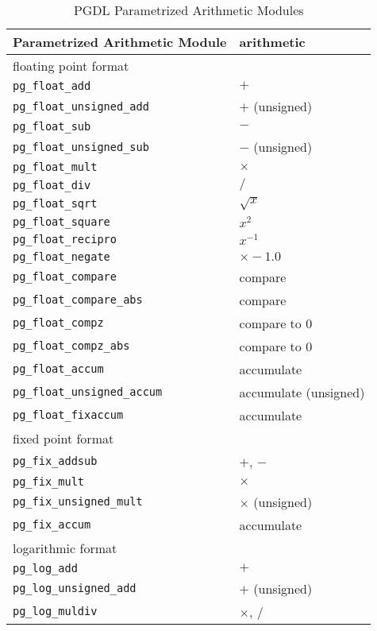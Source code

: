 \documentclass{llncs}
\begin{document}
\begin{table}
\caption{PGDL Parametrized Arithmetic Modules}
\begin{center}
\begin{tabular}{ll}
\hline
\hline
Parametrized Arithmetic Module &  arithmetic\\
\hline
floating point format & \\
 {\tt pg\_float\_add}           &  $+$\\
 {\tt pg\_float\_unsigned\_add} &  $+$ (unsigned)\\
 {\tt pg\_float\_sub}           &  $-$\\
 {\tt pg\_float\_unsigned\_sub} &  $-$ (unsigned)\\
 {\tt pg\_float\_mult}          &  $\times$\\
 {\tt pg\_float\_div}           &  $/$ \\
 {\tt pg\_float\_sqrt}          &  $\sqrt{x}$ \\
 {\tt pg\_float\_square}        &  $x^2$\\
 {\tt pg\_float\_recipro}       &  $x^{-1}$\\
 {\tt pg\_float\_negate}        &  $\times -1.0$\\
 {\tt pg\_float\_compare}       &  compare\\
 {\tt pg\_float\_compare\_abs}  &  compare\\
 {\tt pg\_float\_compz}         &  compare to 0\\
 {\tt pg\_float\_compz\_abs}    &  compare to 0\\
 {\tt pg\_float\_accum}         &  accumulate\\
 {\tt pg\_float\_unsigned\_accum}&  accumulate (unsigned)\\
 {\tt pg\_float\_fixaccum}      &  accumulate\\
fixed point format & \\
 {\tt pg\_fix\_addsub}          &  $+$, $-$\\
 {\tt pg\_fix\_mult}            &  $\times$\\
 {\tt pg\_fix\_unsigned\_mult}  &  $\times$ (unsigned)\\
 {\tt pg\_fix\_accum}           &  accumulate\\
logarithmic format& \\
 {\tt pg\_log\_add}             &  $+$\\
 {\tt pg\_log\_unsigned\_add}   &  $+$ (unsigned)\\
 {\tt pg\_log\_muldiv}          &  $\times$, $/$\\

\end{tabular}
\end{center}
\end{table}
\end{document}
